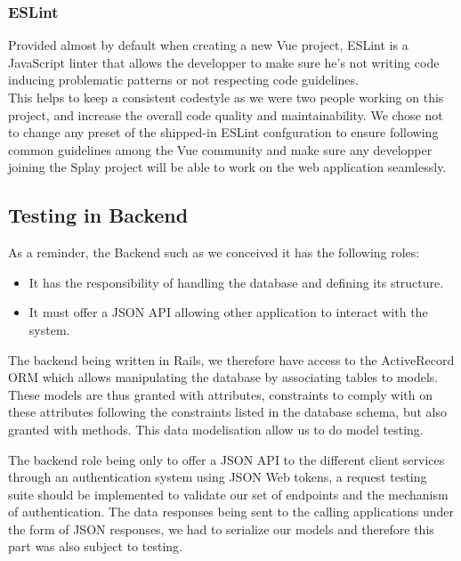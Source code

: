 \documentclass{eplmastersthesis}
\begin{document}
        \subsubsection{ESLint}

          Provided almost by default when creating a new Vue project, ESLint
          \cite{eslint} is a JavaScript linter that allows the developper to
          make sure he's not writing code inducing problematic patterns or not
          respecting code guidelines.\\
          This helps to keep a consistent codestyle as we were two people working
          on this project, and increase the overall code quality and
          maintainability. We chose not to change any preset of the shipped-in
          ESLint confguration to ensure following common guidelines among the Vue
          community and make sure any developper joining the Splay project will
          be able to work on the web application seamlessly.

      \subsection{Testing in Backend}

        As a reminder, the Backend such as we conceived it has the following
        roles:

        \begin{itemize}
          \item It has the responsibility of handling the database and
          defining its structure.
          \item It must offer a JSON API allowing other application to interact
          with the system.
        \end{itemize}

        The backend being written in Rails, we therefore have access to the
        ActiveRecord ORM which allows manipulating the database by associating
        tables to models. These models are thus granted with attributes,
        constraints to comply with on these attributes following the constraints
        listed in the database schema, but also granted with methods. This data
        modelisation allow us to do model testing.

        The backend role being only to offer a JSON API to the different client
        services through an authentication system using JSON Web tokens, a
        request testing suite should be implemented to validate our set of
        endpoints and the mechanism of authentication.
        The data responses being sent to the calling applications under the form
        of JSON responses, we had to serialize our models and therefore this
        part was also subject to testing.
\end{document}
